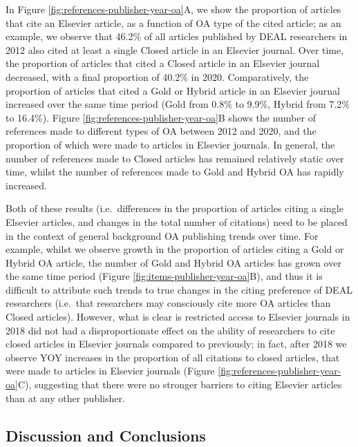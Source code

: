 \documentclass[
]{article}
\begin{document}
In Figure \ref{fig:references-publisher-year-oa}A, we show the proportion of articles that cite an Elsevier article, as a function of OA type of the cited article; as an example, we observe that 46.2\% of all articles published by DEAL researchers in 2012 also cited at least a single Closed article in an Elsevier journal. Over time, the proportion of articles that cited a Closed article in an Elsevier journal decreased, with a final proportion of 40.2\% in 2020. Comparatively, the proportion of articles that cited a Gold or Hybrid article in an Elsevier journal increased over the same time period (Gold from 0.8\% to 9.9\%, Hybrid from 7.2\% to 16.4\%). Figure \ref{fig:references-publisher-year-oa}B shows the number of references made to different types of OA between 2012 and 2020, and the proportion of which were made to articles in Elsevier journals. In general, the number of references made to Closed articles has remained relatively static over time, whilst the number of references made to Gold and Hybrid OA has rapidly increased.

Both of these results (i.e.~differences in the proportion of articles citing a single Elsevier articles, and changes in the total number of citations) need to be placed in the context of general background OA publishing trends over time. For example, whilst we observe growth in the proportion of articles citing a Gold or Hybrid OA article, the number of Gold and Hybrid OA articles has grown over the same time period (Figure \ref{fig:items-publisher-year-oa}B), and thus it is difficult to attribute such trends to true changes in the citing preference of DEAL researchers (i.e.~that researchers may consciously cite more OA articles than Closed articles). However, what is clear is restricted access to Elsevier journals in 2018 did not had a disproportionate effect on the ability of researchers to cite closed articles in Elsevier journals compared to previously; in fact, after 2018 we observe YOY increases in the proportion of all citations to closed articles, that were made to articles in Elsevier journals (Figure \ref{fig:references-publisher-year-oa}C), suggesting that there were no stronger barriers to citing Elsevier articles than at any other publisher.

\hypertarget{discussion-and-conclusions}{%
\subsection{Discussion and Conclusions}\label{discussion-and-conclusions}}
\end{document}
